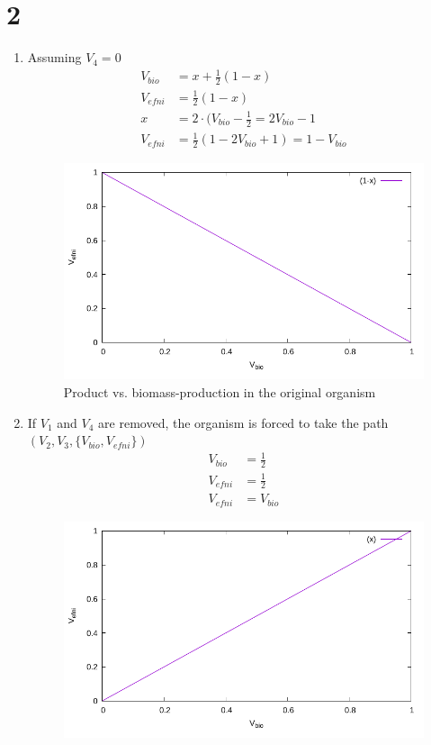 \documentclass{scrartcl}
\begin{document}
\section{2}
	\begin{enumerate}
		\item Assuming $V_4=0$
			\begin{align}
				V_{bio} &= x + \frac{1}{2} (1-x) \\
				V_{efni} &= \frac{1}{2} (1-x)\\
				x &= 2\cdot (V_{bio}-\frac{1}{2} = 2V_{bio} - 1\\
				V_{efni} &= \frac{1}{2} ( 1 - 2V_{bio} + 1) = 1-V_{bio}
			\end{align}
			\begin{figure}[H]
				\centering
				\includegraphics{2_a.pdf}
				\caption{Product vs. biomass-production in the original organism}
			\end{figure}
		\item If $V_1$ and $V_4$ are removed, the organism is forced to take the path $(V_2,V_3,\{V_{bio},V_{efni}\})$ 
			\begin{align}
				V_{bio} &= \frac{1}{2}\\
				V_{efni} &= \frac{1}{2}\\
				V_{efni} &= V_{bio}
			\end{align}
			\begin{figure}[H]
				\centering
				\includegraphics{2_b.pdf}

\end{figure}
\end{enumerate}
\end{document}
